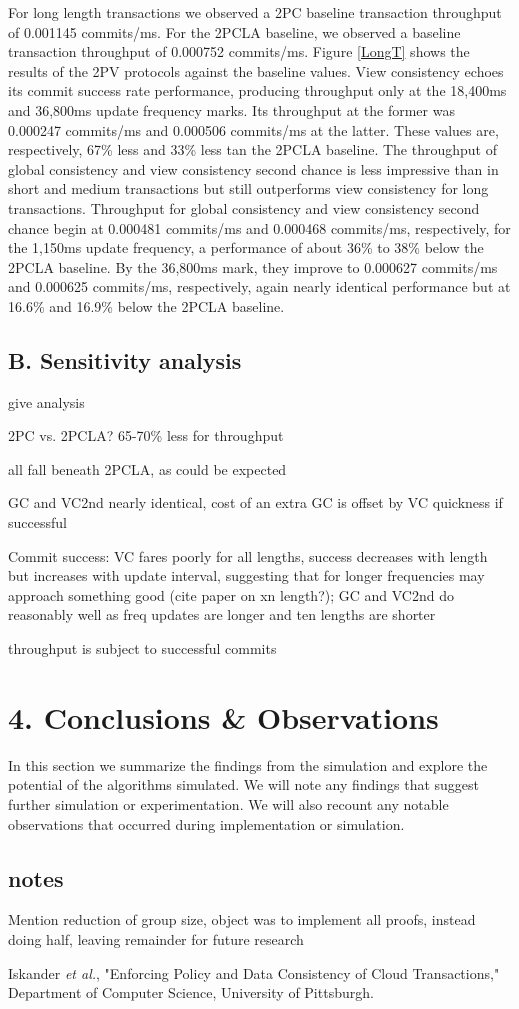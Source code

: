 \documentclass[11pt]{article}
\begin{document}
For long length transactions we observed a 2PC baseline transaction throughput of 0.001145 commits/ms. For the 2PCLA baseline, we observed a baseline transaction throughput of 0.000752 commits/ms. Figure \ref{LongT} shows the results of the 2PV protocols against the baseline values. View consistency echoes its commit success rate performance, producing throughput only at the 18,400ms and 36,800ms update frequency marks. Its throughput at the former was 0.000247 commits/ms and 0.000506 commits/ms at the latter. These values are, respectively, 67\% less and 33\% less tan the 2PCLA baseline. The throughput of global consistency and view consistency second chance is less impressive than in short and medium transactions but still outperforms view consistency for long transactions. Throughput for global consistency and view consistency second chance begin at 0.000481 commits/ms and 0.000468 commits/ms, respectively, for the 1,150ms update frequency, a performance of about 36\% to 38\% below the 2PCLA baseline. By the 36,800ms mark, they improve to 0.000627 commits/ms and 0.000625 commits/ms, respectively, again nearly identical performance but at 16.6\% and 16.9\% below the 2PCLA baseline.
\subsection{B. Sensitivity analysis}
give analysis

2PC vs. 2PCLA? 65-70\% less for throughput

all fall beneath 2PCLA, as could be expected

GC and VC2nd nearly identical, cost of an extra GC is offset by VC quickness if successful

Commit success: VC fares poorly for all lengths, success decreases with length but increases with update interval, suggesting that for longer frequencies may approach something good (cite paper on xn length?); GC and VC2nd do reasonably well as freq updates are longer and ten lengths are shorter

throughput is subject to successful commits
\section{4. Conclusions \& Observations}
In this section we summarize the findings from the simulation and explore the potential of the algorithms simulated. We will note any findings that suggest further simulation or experimentation. We will also recount any notable observations that occurred during implementation or simulation.
\subsection{notes}
Mention reduction of group size, object was to implement all proofs, instead doing half, leaving remainder for future research
\begin{thebibliography}{9}
 Iskander \emph{et al.}, "Enforcing Policy and Data Consistency of Cloud Transactions," Department of Computer Science, University of Pittsburgh.
\end{thebibliography}
\end{document}
